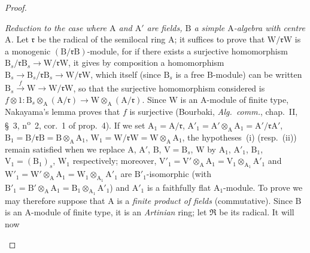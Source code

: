 \begin{proof}
\begin{env}[2.5.8.8]
\label{IV.2.5.8.8}
\emph{Reduction to the case where $\mathrm{A}$ and $\mathrm{A}'$ are
fields, $\mathrm{B}$ a simple $\mathrm{A}$-algebra with centre
$\mathrm{A}$.}
Let $\mathfrak{r}$ be the radical of the semilocal ring $\mathrm{A}$;
it suffices to prove that $\mathrm{W}/\mathfrak{r}\mathrm{W}$ is a
monogenic $(\mathrm{B}/\mathfrak{r}\mathrm{B})$-module, for if there
exists a surjective homomorphism
$\mathrm{B}_s/\mathfrak{r}\mathrm{B}_s\to\mathrm{W}/\mathfrak{r}\mathrm{W}$,
it gives by composition a homomorphism
$\mathrm{B}_s\to\mathrm{B}_s/\mathfrak{r}\mathrm{B}_s\to\mathrm{W}/\mathfrak{r}\mathrm{W}$,
which itself \textnormal{(}since $\mathrm{B}_s$ is a free
$\mathrm{B}$-module\textnormal{)} can be written
$\mathrm{B}_s\xrightarrow{f}\mathrm{W}\to\mathrm{W}/\mathfrak{r}\mathrm{W}$,
so that the surjective homomorphism considered is
$f\otimes1:\mathrm{B}_s\otimes_{\mathrm{A}}(\mathrm{A}/\mathfrak{r})
\longrightarrow\mathrm{W}\otimes_{\mathrm{A}}(\mathrm{A}/\mathfrak{r})$.
Since $\mathrm{W}$ is an $\mathrm{A}$-module of finite type, Nakayama's
lemma proves that $f$ is surjective (Bourbaki, \emph{Alg.\ comm.},
chap.~II, \S~3, n\textsuperscript{o}~2, cor.~1 of prop.~4). If we set
$\mathrm{A}_1=\mathrm{A}/\mathfrak{r}$,
$\mathrm{A}'_1=\mathrm{A}'\otimes_{\mathrm{A}}\mathrm{A}_1=\mathrm{A}'/\mathfrak{r}\mathrm{A}'$,
$\mathrm{B}_1=\mathrm{B}/\mathfrak{r}\mathrm{B}=\mathrm{B}\otimes_{\mathrm{A}}\mathrm{A}_1$,
$\mathrm{W}_1=\mathrm{W}/\mathfrak{r}\mathrm{W}=\mathrm{W}\otimes_{\mathrm{A}}\mathrm{A}_1$,
the hypotheses~(i) \textnormal{(}resp.~(ii)\textnormal{)} remain satisfied
when we replace $\mathrm{A}$, $\mathrm{A}'$, $\mathrm{B}$,
$\mathrm{V}=\mathrm{B}_s$, $\mathrm{W}$ by $\mathrm{A}_1$, $\mathrm{A}'_1$,
$\mathrm{B}_1$, $\mathrm{V}_1=(\mathrm{B}_1)_s$, $\mathrm{W}_1$
respectively; moreover,
$\mathrm{V}'_1=\mathrm{V}'\otimes_{\mathrm{A}}\mathrm{A}_1=\mathrm{V}_1\otimes_{\mathrm{A}_1}\mathrm{A}'_1$
and
$\mathrm{W}'_1=\mathrm{W}'\otimes_{\mathrm{A}}\mathrm{A}_1=\mathrm{W}_1\otimes_{\mathrm{A}_1}\mathrm{A}'_1$
are $\mathrm{B}'_1$-isomorphic \textnormal{(}with
$\mathrm{B}'_1=\mathrm{B}'\otimes_{\mathrm{A}}\mathrm{A}_1=\mathrm{B}_1\otimes_{\mathrm{A}_1}\mathrm{A}'_1$\textnormal{)}
and $\mathrm{A}'_1$ is a faithfully flat $\mathrm{A}_1$-module. To prove
 we may therefore suppose that $\mathrm{A}$ is a
\emph{finite product of fields} \textnormal{(}commutative\textnormal{)}.
Since $\mathrm{B}$ is an $\mathrm{A}$-module of finite type, it is an
\emph{Artinian} ring; let $\mathfrak{R}$ be its radical. It will now

\end{env}
\end{proof}
